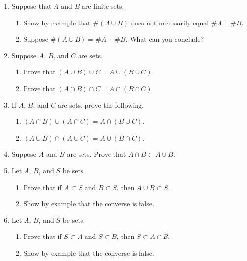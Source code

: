\begin{enumerate}
    \item Suppose that $A$ and $B$ are finite sets.
  \begin{enumerate}
      \item Show by example that $\# (A \cup B)$ does not necessarily equal $\# A + \# B$. 
      \item Suppose $\# (A \cup B) = \# A + \# B$. What can you conclude?
  \end{enumerate}

    \item Suppose $A$, $B$, and $C$ are sets.
  \begin{enumerate}
      \item Prove that $(A \cup B) \cup C = A \cup (B \cup C)$.
      \item Prove that $(A \cap B) \cap C = A \cap (B \cap C)$.
  \end{enumerate}

    \item If $A$, $B$, and $C$ are sets, prove the following.
  \begin{enumerate}
      \item $(A \cap B) \cup (A \cap C) = A \cap (B \cup C)$.
      \item $(A \cup B) \cap (A \cup C) = A \cup (B \cap C)$.
  \end{enumerate}

    \item Suppose $A$ and $B$ are sets. Prove that $A \cap B \subset A \cup B$.

    \item Let $A$, $B$, and $S$ be sets.
  \begin{enumerate}
      \item Prove that if $A \subset S$ and $B \subset S$, then $A \cup B \subset S$.
      \item Show by example that the converse is false.
  \end{enumerate}


    \item Let $A$, $B$, and $S$ be sets.
  \begin{enumerate}
      \item Prove that if $S \subset A$ and $S \subset B$, then $S \subset A \cap B$.
      \item Show by example that the converse is false.
  \end{enumerate}



\end{enumerate}

